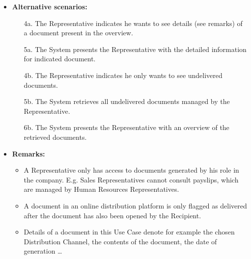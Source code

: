 \documentclass[a4paper,10pt]{article}
\begin{document}
\begin{itemize}
    \item \textbf{Alternative scenarios:} 
    \begin{enumerate}
        \item [4a.] The Representative indicates he wants to see details (see remarks) of a document present in the overview.
        \item [5a.] The System presents the Representative with the detailed information for indicated document.
        \item [4b.] The Representative indicates he only wants to see undelivered documents.
        \item [5b.] The System retrieves all undelivered documents managed by the Representative.
        \item [6b.] The System presents the Representative with an overview of the retrieved documents.
    \end{enumerate}
    
    \item \textbf{Remarks:}
        \begin{itemize}
            \item A Representative only has access to documents generated by his role in the company. E.g. Sales Representatives cannot consult payslips, which are managed by Human Resources Representatives.
            \item A document in an online distribution platform is only flagged as delivered after the document has also been opened by the Recipient.
            \item Details of a document in this Use Case denote for example the chosen Distribution Channel, the contents of the document, the date of generation \ldots
        \end{itemize}
\end{itemize}
\end{document}
